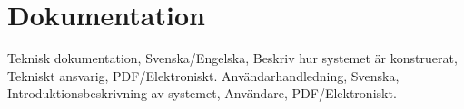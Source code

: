 \section{Dokumentation}
Teknisk dokumentation, Svenska/Engelska, Beskriv hur systemet är konstruerat, Tekniskt ansvarig, PDF/Elektroniskt.
Användarhandledning, Svenska, Introduktionsbeskrivning av systemet, Användare, PDF/Elektroniskt.